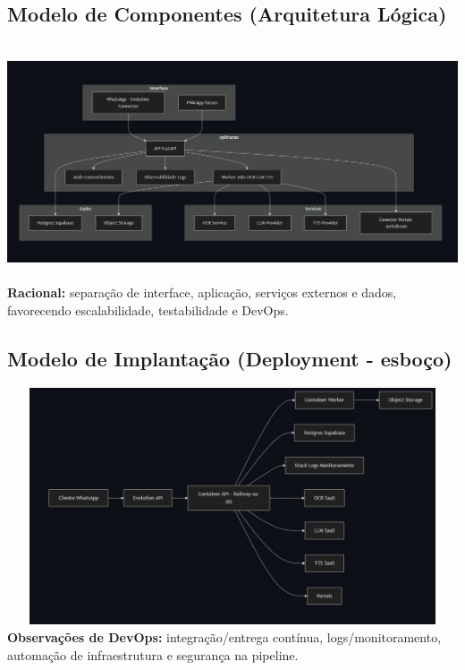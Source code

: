 \documentclass{article}
\begin{document}
\subsection{Modelo de Componentes (Arquitetura Lógica)}
\includegraphics[width=1.3\textwidth,height=7cm,keepaspectratio]{images/Modelo-de-Componentes.jpg}
\textbf{Racional:} separação de interface, aplicação, serviços externos e dados, favorecendo escalabilidade, testabilidade e DevOps.

\subsection{Modelo de Implantação (Deployment - esboço)}
\includegraphics[width=1.4\textwidth,height=7cm,keepaspectratio]{images/Modelo-de-Implantacao.jpg}
\textbf{Observações de DevOps: } integração/entrega contínua, logs/monitoramento, automação de infraestrutura e segurança na pipeline.
\end{document}
